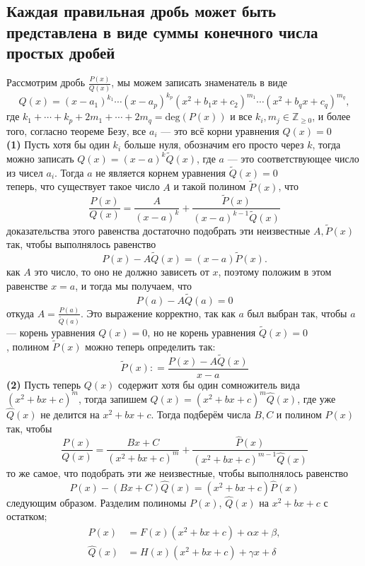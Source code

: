 \documentclass[a4paper]{article}
\begin{document}
\subsection{Каждая правильная дробь может быть представлена в виде суммы конечного числа простых дробей}
Рассмотрим дробь $\displaystyle\frac{P(x)}{Q(x)}$, мы можем записать знаменатель в виде 
$$
Q(x) = (x - a_1)^{k_1} \cdots (x-a_p)^{k_p} (x^2 + b_1x + c_2)^{m_1}\cdots (x^2 + b_qx + c_q)^{m_q}, 
$$
где $k_1 + \cdots + k_p + 2m_1 + \cdots + 2m_q = \mathrm{deg}(P(x))$ и все $k_i, m_j \in \mathbb{Z}_{\geqslant 0}$, и более того, согласно теореме Безу, все $a_i$ — это всё корни уравнения $Q(x) =0$\\[2mm]
\indent\textbf{(1)} Пусть хотя бы один $k_i$ больше нуля, обозначим его просто через $k$, тогда можно записать $Q(x) = (x-a)^k \widetilde{Q}(x)$, где $a$ — это соответствующее число из чисел $a_i$. Тогда $a$ не является корнем уравнения $\widetilde{Q}(x) =0$\\[2mm]
 теперь, что существует такое число $A$ и такой полином $\widetilde{P}(x)$, что 
$$
\frac{P(x)}{Q(x)} = \frac{A}{(x-a)^k} + \frac{\widetilde{P}(x)}{(x-a)^{k-1}\widetilde{Q}(x)}
$$
 доказательства этого равенства достаточно подобрать эти неизвестные $A, \widetilde{P}(x)$ так, чтобы выполнялось равенство
$$
P(x) - A \widetilde{Q}(x) = (x-a)\widetilde{P}(x).
$$
 как $A$ это число, то оно не должно зависеть от $x$, поэтому положим в этом равенстве $x = a$, и тогда мы получаем, что
$$
P(a) - A \widetilde{Q}(a) = 0
$$
откуда $A = \displaystyle\frac{P(a)}{\widetilde{Q}(a)}$. Это выражение корректно, так как $a$ был выбран так, чтобы $a$ — корень уравнения $Q(x) =0$, но не корень уравнения $\widetilde{Q}(x) = 0$\\[2mm]
, полином $\widetilde{P}(x)$ можно теперь определить так:
$$
\widetilde{P}(x): = \frac{P(x) - A \widetilde{Q}(x)}{x-a}
$$
\indent\textbf{(2)} Пусть теперь $Q(x)$ содержит хотя бы один сомножитель вида $(x^2 + bx + c)^m$, тогда запишем $Q(x)= (x^2 + bx + c)^m \widehat{Q}(x)$, где уже $\widehat{Q}(x)$ не делится на $x^2 + bx + c$. Тогда подберём числа $B,C$ и полином $\widehat{P}(x)$ так, чтобы
$$
\frac{P(x)}{Q(x)} = \frac{Bx + C}{(x^2 + bx + c)^m} + \frac{\widehat{P}(x)}{(x^2 + bx + c)^{m-1} \widehat{Q}(x)}
$$
 то же самое, что подобрать эти же неизвестные, чтобы выполнялось равенство
$$
P(x) - (Bx +C)\widehat{Q}(x) = (x^2 + bx + c) \widehat{P}(x)
$$
 следующим образом. Разделим полиномы $P(x)$, $\widehat{Q}(x)$ на $x^2 + bx + c$ с остатком;
$$\begin{aligned}
P(x) &= F(x)(x^2 + bx + c) + \alpha x + \beta, \\
\widehat{Q}(x) &= H(x)(x^2 + bx + c) + \gamma x + \delta
\end{aligned}$$
\end{document}
